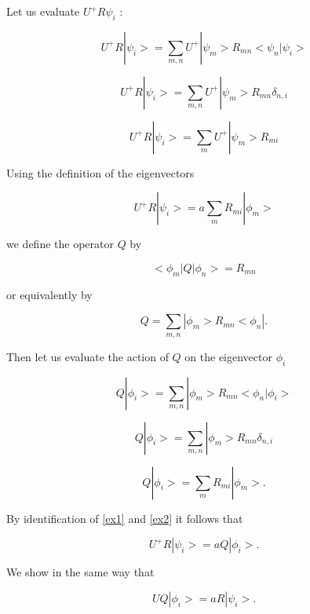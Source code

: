 \begin{pf}
Let us evaluate $U^+R\psi_i$ :
 
\begin{equation}
U^+R|\psi_i>=\sum_{m,n}U^+|\psi_m>R_{m n}<\psi_n|\psi_i>
\end{equation}
 
 
\begin{equation}
U^+R|\psi_i>=\sum_{m,n}U^+|\psi_m>R_{m n}\delta_{n,i}
\end{equation}
 
 
\begin{equation}
U^+R|\psi_i>=\sum_{m}U^+|\psi_m>R_{m i}
\end{equation}
 
Using the definition of the eigenvectors

\begin{equation}
U^+R|\psi_i>=a\sum_{m}R_{m i}|\phi_m>
\label{ex2}
\end{equation}

we define the operator $Q$ by


\begin{equation}
<\phi_m|Q|\phi_n>=R_{m n}
\end{equation}
 

or equivalently by 

\begin{equation}
Q=\sum_{m,n}|\phi_m>R_{m n}<\phi_n|.
\end{equation}
 
 

Then let us evaluate the action of $Q$ on the eigenvector $\phi_i$

 
\begin{equation}
Q|\phi_i>=\sum_{m,n}|\phi_m>R_{m n}<\phi_n|\phi_i>
\end{equation}
 
\begin{equation}
Q|\phi_i>=\sum_{m,n}|\phi_m>R_{m n}\delta_{n,i}
\end{equation}
 
\begin{equation}
Q|\phi_i>=\sum_{m}R_{m i}|\phi_m>.
\label{ex1}
\end{equation}
 
By identification of \ref{ex1} and \ref{ex2} it follows that 
 
\begin{equation}
U^+R|\psi_i>=a Q|\phi_i>.
\end{equation}
 
We show in the same way that
 
\begin{equation}
U Q|\phi_i>=a R|\psi_i>.
\end{equation}
 
\end{pf}



